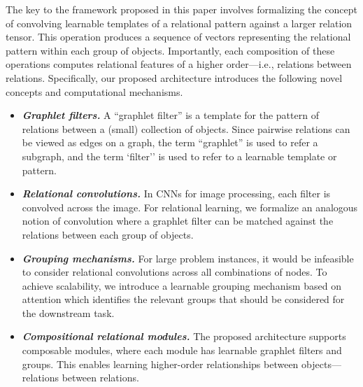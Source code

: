 The key to the framework proposed in this paper involves formalizing the concept of convolving learnable templates of a relational pattern against a larger relation tensor. This operation produces a sequence of vectors representing the relational pattern within each group of objects. Importantly, each composition of these operations computes relational features of a higher order---i.e., relations between relations. Specifically, our proposed architecture introduces the following novel concepts and computational mechanisms.
\begin{itemize}[itemsep=1pt]
    \item \textit{\bfseries Graphlet filters.} A ``graphlet filter'' is a template for the pattern of relations between a (small) collection of objects. 
    Since pairwise relations can be viewed as edges on a graph, the term ``graphlet'' is used to refer a subgraph, and the term `filter'' is used to refer to a learnable template or pattern.
    \item \textit{\bfseries Relational convolutions.} In CNNs for image processing, each filter is
    convolved across the image. For relational learning, we formalize an analogous notion of convolution where a graphlet filter can be matched against the relations between each group of objects.
    \item \textit{\bfseries Grouping mechanisms.} For large problem instances, it would be infeasible to consider relational convolutions across all combinations of nodes. To achieve scalability, we introduce a learnable grouping mechanism based on attention which identifies the relevant groups that should be considered for the downstream task. %
    \item \textit{\bfseries Compositional relational modules.} The proposed architecture supports composable modules, where each module has learnable graphlet filters and groups. This enables learning higher-order relationships between objects---relations between relations.
\end{itemize}


